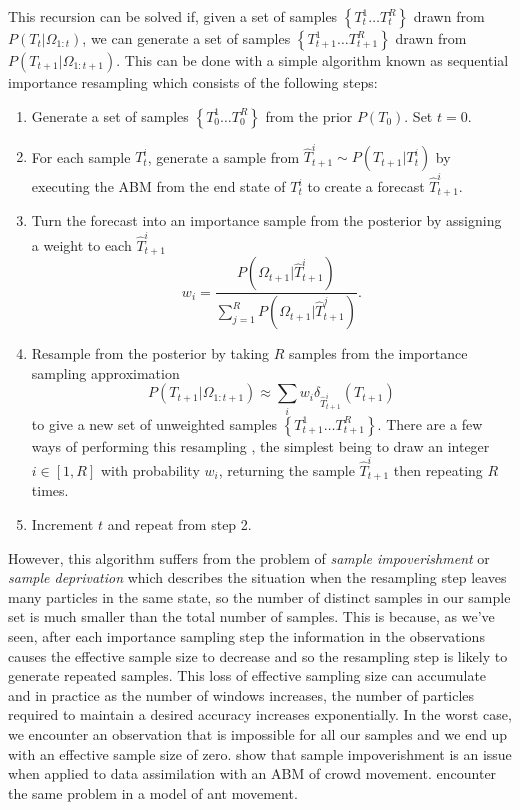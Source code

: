 \documentclass{article}
\begin{document}
This recursion can be solved if, given a set of samples $\left\{T_t^1 \dots T_t^R\right\}$ drawn from $P(T_t|\Omega_{1:t})$, we can generate a set of samples  $\left\{T_{t+1}^1 \dots T_{t+1}^R\right\}$ drawn from $P(T_{t+1}|\Omega_{1:t+1})$. This can be done with a simple algorithm known as sequential importance resampling which consists of the following steps:
\begin{enumerate}
\item Generate a set of samples $\left\{T^1_0 \dots T^R_0\right\}$ from the prior $P(T_0)$. Set $t=0$.

\item For each sample $T_t^i$, generate a sample from $\hat{T}_{t+1}^i \sim P(T_{t+1}|T^i_t)$ by executing the ABM from the end state of $T^i_t$ to create a forecast $\hat{T}_{t+1}^i$.

\item Turn the forecast into an importance sample from the posterior by assigning a weight to each $\hat{T}_{t+1}^i$
\[
w_i = \frac{P(\Omega_{t+1}|\hat{T}_{t+1}^i)}{\sum_{j=1}^R P(\Omega_{t+1}|\hat{T}_{t+1}^j)}.
\]

\item Resample from the posterior by taking $R$ samples from the importance sampling approximation
\begin{equation}
P(T_{t+1}|\Omega_{1:t+1}) \approx  \sum_i w_i\delta_{\hat{T}_{t+1}^i}\left(T_{t+1}\right)
\label{importanceApprox}
\end{equation}
to give a new set of unweighted samples $\left\{T^1_{t+1} \dots T^R_{t+1}\right\}$. There are a few ways of performing this resampling \citep{douc2005comparison}, the simplest being to draw an integer $i\in[1,R]$ with probability $w_i$, returning the sample $\hat{T}_{t+1}^i$ then repeating $R$ times.

\item Increment $t$ and repeat from step 2.

\end{enumerate}

However, this algorithm suffers from the problem of \textit{sample impoverishment} \citep{li2014fight} or \textit{sample deprivation} which describes the situation when the resampling step leaves many particles in the same state, so the number of distinct samples in our sample set is much smaller than the total number of samples. This is because, as we've seen, after each importance sampling step the information in the observations causes the effective sample size to decrease and so the resampling step is likely to generate repeated samples. This loss of effective sampling size can accumulate and in practice as the number of windows increases, the number of particles required to maintain a desired accuracy increases exponentially. In the worst case, we encounter an observation that is impossible for all our samples and we end up with an effective sample size of zero. \citet{malleson_simulating_2020} show that sample impoverishment is an issue when applied to data assimilation with an ABM of crowd movement. \citet{khan2003efficient} encounter the same problem in a model of ant movement.
\end{document}
